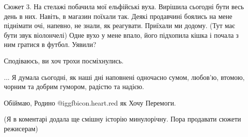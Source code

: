 
Сюжет 3. На стелажі побачила мої ельфійські вуха. Вирішила сьогодні бути весь
день в них. Навіть, в магазин поїхали так. Деякі продавчині боялись на мене
піднімати очі, напевно, не знали, як реагувати. Приїхали ми додому. (Тут має
бути звук віолончелі) Одне вухо у мене впало, його підхопила кішка і почала з
ним гратися в футбол. Уявили? 

Сподіваюсь, ви хоч трохи посміхнулись. 🙂

... Я думала сьогодні, як наші дні наповнені одночасно сумом, любов'ю, втомою,
чорним та добрим гумором, радістю та надією. 

Обіймаю, Родино @igg{fbicon.heart.red} як Хочу Перемоги.

(Я в коментарі додала ще смішну історію минулорічну. Пора продавати сюжети
режисерам)

